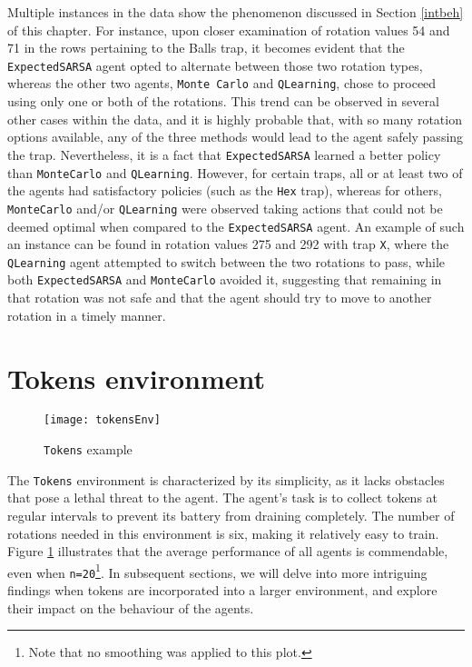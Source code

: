 Multiple instances in the data show the phenomenon discussed in Section \ref{intbeh} of this chapter. For instance, upon closer examination of rotation values 54 and 71 in the rows pertaining to the Balls trap, it becomes evident that the \texttt{ExpectedSARSA} agent opted to alternate between those two rotation types, whereas the other two agents, \texttt{Monte Carlo} and \texttt{QLearning}, chose to proceed using only one or both of the rotations. This trend can be observed in several other cases within the data, and it is highly probable that, with so many rotation options available, any of the three methods would lead to the agent safely passing the trap. Nevertheless, it is a fact that \texttt{ExpectedSARSA} learned a better policy than \texttt{MonteCarlo} and \texttt{QLearning}. However, for certain traps, all or at least two of the agents had satisfactory policies (such as the \texttt{Hex} trap), whereas for others, \texttt{MonteCarlo} and/or \texttt{QLearning} were observed taking actions that could not be deemed optimal when compared to the \texttt{ExpectedSARSA} agent. An example of such an instance can be found in rotation values 275 and 292 with trap \texttt{X}, where the \texttt{QLearning} agent attempted to switch between the two rotations to pass, while both \texttt{ExpectedSARSA} and \texttt{MonteCarlo} avoided it, suggesting that remaining in that rotation was not safe and that the agent should try to move to another rotation in a timely manner.

\section{Tokens environment}
\begin{figure}[h]
    \centering
    \texttt{[image: tokensEnv]}
    \caption{\texttt{Tokens} example}
    \label{fig:tokens}
\end{figure}

The \texttt{Tokens} environment is characterized by its simplicity, as it lacks obstacles that pose a lethal threat to the agent. The agent's task is to collect tokens at regular intervals to prevent its battery from draining completely. The number of rotations needed in this environment is six, making it relatively easy to train. Figure \ref{fig:tokens} illustrates that the average performance of all agents is commendable, even when \texttt{n=20}\footnote{Note that no smoothing was applied to this plot.}. In subsequent sections, we will delve into more intriguing findings when tokens are incorporated into a larger environment, and explore their impact on the behaviour of the agents.

